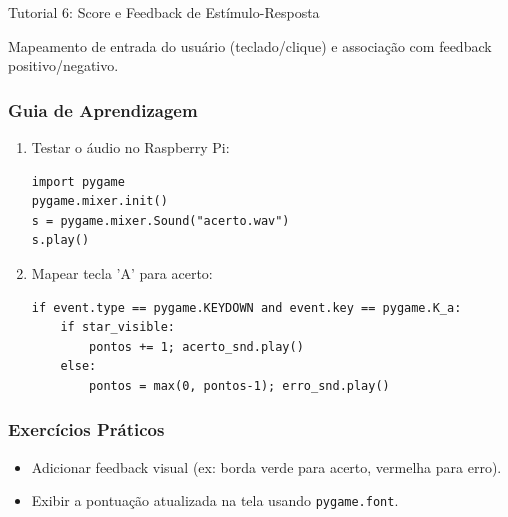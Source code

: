\documentclass[11pt,a4paper]{article}
\begin{document}
\newpage
\begin{boxTutorial}{Tutorial 6: Score e Feedback de Estímulo-Resposta}
\label{sec: Etapa 6: Interação}

    Mapeamento de entrada do usuário (teclado/clique) e associação com feedback positivo/negativo.
    
    \subsubsection*{Guia de Aprendizagem}
    \begin{enumerate}
        \item Testar o áudio no Raspberry Pi:
        \begin{verbatim}
import pygame
pygame.mixer.init()
s = pygame.mixer.Sound("acerto.wav")
s.play()
        \end{verbatim}
    
        \item Mapear tecla 'A' para acerto:
        \begin{verbatim}
if event.type == pygame.KEYDOWN and event.key == pygame.K_a:
    if star_visible:
        pontos += 1; acerto_snd.play()
    else:
        pontos = max(0, pontos-1); erro_snd.play()
        \end{verbatim}
    \end{enumerate}
    
    \subsubsection*{Exercícios Práticos}
    \begin{itemize}
        \item Adicionar feedback visual (ex: borda verde para acerto, vermelha para erro).
        \item Exibir a pontuação atualizada na tela usando \texttt{pygame.font}.
    \end{itemize}
\end{boxTutorial}
\end{document}
